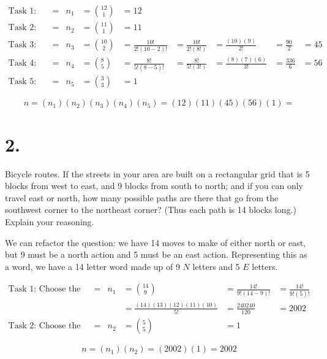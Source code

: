     \begin{mdframed}
        \begin{align*}
            \text{Task 1: Assign the first character as R} & = & n_1 & = {12 \choose 1} & = 12 &    \\
            \text{Task 2: Assign the last character as B} & = & n_2 & = {11 \choose 1} & = 11 &     \\
            \text{Task 3: Assign the remaining R's} & = & n_3 & = {10 \choose 2} & = \frac{10!}{2!(10-2)!} & = \frac{10!}{2!(8!)} & = \frac{(10)(9)}{2!} & = \frac{90}{2} & = 45    \\
            \text{Task 4: Assign the 5 G's} & = & n_4 & = {8 \choose 5} & = \frac{8!}{5!(8-5)!} & = \frac{8!}{5!(3!)} & = \frac{(8)(7)(6)}{3!} & = \frac{336}{6} & = 56 \\
            \text{Task 5: Assign the remaining B's} & = & n_5 & = {3 \choose 3} & = 1
        \end{align*}

        \begin{equation*}
            n = (n_1)(n_2)(n_3)(n_4)(n_5) = (12)(11)(45)(56)(1) = 
        \end{equation*}
    \end{mdframed}

    \pagebreak

    \section*{2.}
    Bicycle routes. If the streets in your area are built on a rectangular grid that is 5 blocks from west to east, and 9 blocks from south to north; and if you can only travel east or north, how many possible paths are there that go from the southwest corner to the northeast corner? (Thus each path is 14 blocks long.) Explain your reasoning.

    \begin{mdframed}
        We can refactor the question: we have 14 moves to make of either north or east, but 9 must be a north action and 5 must be an east action. Representing this as a word, we have a 14 letter word made up of 9 $N$ letters and 5 $E$ letters. 

        \begin{align*}
            \text{Task 1: Choose the positions of the N's} & = & n_1 & = {14 \choose 9} & = \frac{14!}{9!(14-9)!} & = \frac{14!}{9!(5)!}    \\ 
            & & & = \frac{(14)(13)(12)(11)(10)}{5!} & = \frac{240240}{120} & = 2002 \\
            \text{Task 2: Choose the positions of the E's} & = & n_2 & = {5 \choose 5} & = 1
        \end{align*}

        \begin{equation*}
            n = (n_1)(n_2) = (2002)(1) = \boxed{2002}
        \end{equation*}
        
    \end{mdframed}

